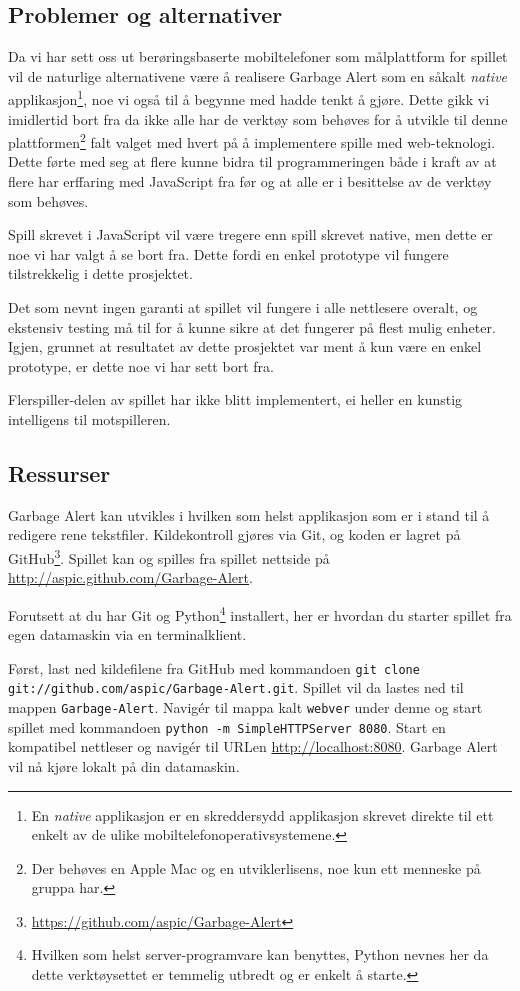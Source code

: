 \subsection{Problemer og alternativer}
Da vi har sett oss ut berøringsbaserte mobiltelefoner som målplattform for spillet vil de naturlige alternativene være å realisere Garbage Alert som en såkalt \emph{native} applikasjon\footnote{En \emph{native} applikasjon er en skreddersydd applikasjon skrevet direkte til ett enkelt av de ulike mobiltelefonoperativsystemene.}, noe vi også til å begynne med hadde tenkt å gjøre. Dette gikk vi imidlertid bort fra da ikke alle har de verktøy som behøves for å utvikle til denne plattformen\footnote{Der behøves en Apple Mac og en utviklerlisens, noe kun ett menneske på gruppa har.} falt valget med hvert på å implementere spille med web-teknologi. Dette førte med seg at flere kunne bidra til programmeringen både i kraft av at flere har erffaring med JavaScript fra før og at alle er i besittelse av de verktøy som behøves.

Spill skrevet i JavaScript vil være tregere enn spill skrevet native, men dette er noe vi har valgt å se bort fra. Dette fordi en enkel prototype vil fungere tilstrekkelig i dette prosjektet.

Det som nevnt ingen garanti at spillet vil fungere i alle nettlesere overalt, og ekstensiv testing må til for å kunne sikre at det fungerer på flest mulig enheter. Igjen, grunnet at resultatet av dette prosjektet var ment å kun være en enkel prototype, er dette noe vi har sett bort fra.

Flerspiller-delen av spillet har ikke blitt implementert, ei heller en kunstig intelligens til motspilleren.


\subsection{Ressurser}
Garbage Alert kan utvikles i hvilken som helst applikasjon som er i stand til å redigere rene tekstfiler. Kildekontroll gjøres via Git, og koden er lagret på GitHub\footnote{\url{https://github.com/aspic/Garbage-Alert}}. Spillet kan og spilles fra spillet nettside på \url{http://aspic.github.com/Garbage-Alert}.

Forutsett at du har Git og Python\footnote{Hvilken som helst server-programvare kan benyttes, Python nevnes her da dette verktøysettet er temmelig utbredt og er enkelt å starte.} installert, her er hvordan du starter spillet fra egen datamaskin via en terminalklient.

Først, last ned kildefilene fra GitHub med kommandoen \newline\texttt{git clone git://github.com/aspic/Garbage-Alert.git}. Spillet vil da lastes ned til mappen \texttt{Garbage-Alert}. Navigér til mappa kalt \texttt{webver} under denne  og start spillet med kommandoen \texttt{python -m SimpleHTTPServer 8080}. Start en kompatibel nettleser og navigér til URLen \url{http://localhost:8080}. Garbage Alert vil nå kjøre lokalt på din datamaskin.